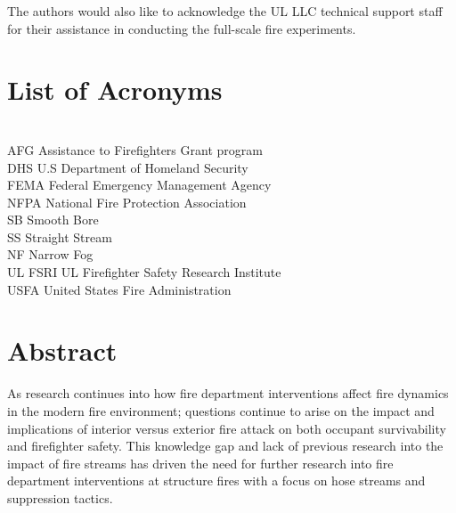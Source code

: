 \documentclass[12pt,oneside]{book}
\begin{document}
The authors would also like to acknowledge the UL LLC technical support staff for their assistance in conducting the full-scale fire experiments.

\cleardoublepage
{}
{}
\tableofcontents

\cleardoublepage
{}
{}
\listoffigures

\cleardoublepage
{}
{}
\listoftables

\chapter{List of Acronyms}

\begin{tabbing}
\hspace{1.5in} \= \\
AFG \> Assistance to Firefighters Grant program  \\
DHS \> U.S Department of Homeland Security   \\   
FEMA \> Federal Emergency Management Agency  \\
NFPA \> National Fire Protection Association \\
SB \> Smooth Bore \\
SS \> Straight Stream \\
NF \> Narrow Fog \\
UL FSRI \> UL Firefighter Safety Research Institute \\
USFA \> United States Fire Administration  \\
\end{tabbing}

\newpage

\mainmatter

\chapter*{Abstract}

As research continues into how fire department interventions affect fire dynamics in the modern fire environment; questions continue to arise on the impact and implications of interior versus exterior fire attack on both occupant survivability and firefighter safety. This knowledge gap and lack of previous research into the impact of fire streams has driven the need for further research into fire department interventions at structure fires with a focus on hose streams and suppression tactics.
\end{document}
